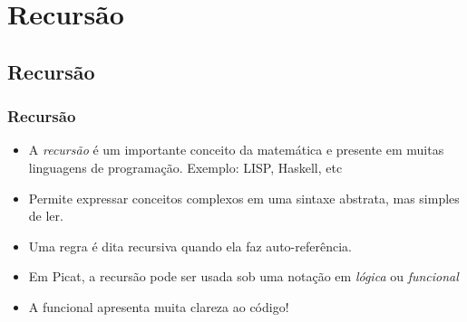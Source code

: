 
\section{Recursão}

\subsection{Recursão}
\begin{frame}[fragile]

\frametitle{Recursão}

\begin{itemize}

    \item A \textit{recursão} é um importante conceito da matemática e presente em muitas  linguagens
    de programação. Exemplo: LISP, Haskell, etc

    \pause
    \item Permite expressar conceitos complexos em uma sintaxe abstrata, mas  simples de ler.
    \pause
    \item Uma regra é dita recursiva quando ela faz auto-referência.
    
    \pause
    \item Em Picat, a recursão pode ser usada sob uma notação em \textit{lógica} ou \textit{funcional}
    
    \pause
    \item A funcional apresenta muita clareza ao código!
\end{itemize}

  
\end{frame}


